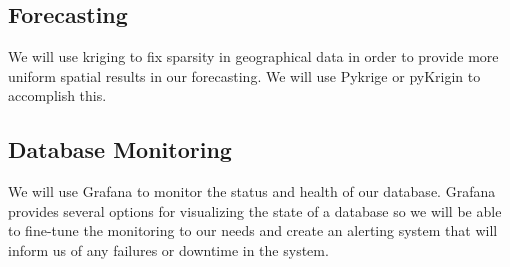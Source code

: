 \subsection{Forecasting}
\noindent We will use kriging to fix sparsity in geographical data in order to provide more uniform spatial results in our forecasting.
We will use Pykrige or pyKrigin to accomplish this. 

\subsection{Database Monitoring}
\noindent We will use Grafana to monitor the status and health of our database.
Grafana provides several options for visualizing the state of a database so we will be able to fine-tune the monitoring to our needs and create an alerting system that will inform us of any failures or downtime in the system. 

